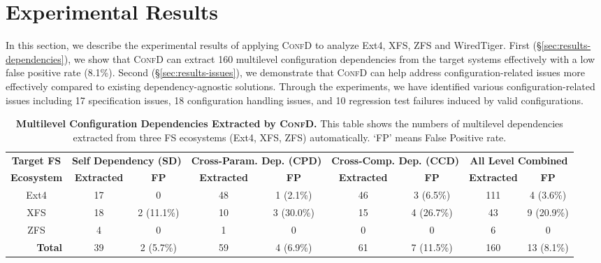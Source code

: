\section{Experimental Results}
\label{sec:results}

In this section, we describe the experimental results of applying \textsc{ConfD} to analyze Ext4, XFS, ZFS and WiredTiger.
First (\S\ref{sec:results-dependencies}), we show that \textsc{ConfD} can extract 160 multilevel configuration dependencies from the target systems  effectively with a low false positive rate (8.1\%).
Second (\S\ref{sec:results-issues}), we demonstrate that \textsc{ConfD} can help address configuration-related issues more effectively compared to existing dependency-agnostic solutions. 
Through the experiments, we have identified various configuration-related issues including 17 specification issues, 18 configuration handling issues, and 10 regression test failures induced by valid configurations. 



 \begin{table*}[t]
	\small
	\begin{center}
		\begin{tabular}{ c | c | c | c | c | c | c | c | c}
			\textbf{Target FS } & \multicolumn{2}{c|}{\textbf{Self Dependency (SD)}} & \multicolumn{2}{c|}{\textbf{ Cross-Param. Dep. (CPD)}}  & \multicolumn{2}{c|}{\textbf{Cross-Comp. Dep. (CCD)}} & \multicolumn{2}{c}{\textbf{All Level Combined}}\\
 \cline{2-9}
		
		 \textbf{Ecosystem} & \textbf{Extracted}  &  \textbf{FP} &  \textbf{Extracted}  &   \textbf{FP}  &  \textbf{Extracted} &  \textbf{FP}   & \textbf{Extracted} &  \textbf{FP} \\
					\hline
{Ext4}  & 17 & 0  & 48 & 1 (2.1\%) & 46 & 3 (6.5\%) & 111 & 4 (3.6\%) \\
			\hline
{XFS}  & 18 & 2 (11.1\%) & 10  & 3 (30.0\%) & 15 & 4 (26.7\%) & 43 & 9 (20.9\%)\\
			\hline
{ZFS} & 4 & 0 & 1 & 0 & 0 & 0 & 6 & 0\\
                \hline
 \multicolumn{1}{r|}{\textbf{Total}} & 39 & 2  (5.7\%) & 59 & 4 (6.9\%) & 61 &  7 (11.5\%)  &  160 & 13 (8.1\%)\\
\hline
		\end{tabular}
	\end{center}
	\caption{ {\bf  Multilevel Configuration Dependencies Extracted by \textsc{ConfD}.} This table shows the numbers of multilevel  dependencies extracted from three FS ecosystems (Ext4, XFS, ZFS) automatically.  `FP' means False Positive rate.  
}
	\label{tab:accuracyofdependency}
\end{table*}

